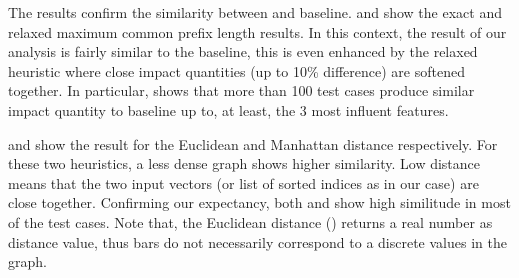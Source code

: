 The results confirm the similarity between \impatto{} and baseline.
 and  show the exact and relaxed maximum common prefix length results.
In this context, the result of our analysis \impatto{} is fairly similar to the baseline, this is even enhanced by the relaxed heuristic where close impact quantities (up to 10\% difference) are softened together.
In particular,  shows that more than 100 test cases produce similar impact quantity to baseline up to, at least, the 3 most influent features.

 and  show the result for the Euclidean and Manhattan distance respectively.
For these two heuristics, a less dense graph shows higher similarity. Low distance means that the two input vectors (or list of sorted indices as in our case) are close together.
Confirming our expectancy, both  and  show high similitude in most of the test cases.
Note that, the Euclidean distance (\euclidean) returns a real number as distance value, thus bars do not necessarily correspond to a discrete values in the graph.

\setlength\figureheight{5cm}
\setlength\figurewidth{5cm}

